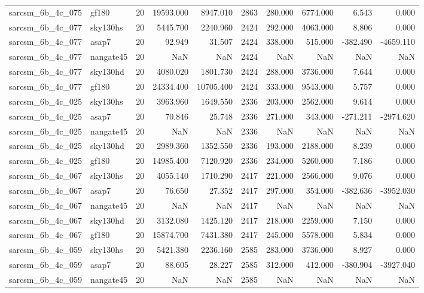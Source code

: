 \begin{longtable}{llrrrrrrrr}
sarcsm\_6b\_4c\_075 & gf180 & 20 & 19593.000 & 8947.010 & 2863 & 280.000 & 6774.000 & 6.543 & 0.000 \\
sarcsm\_6b\_4c\_077 & sky130hs & 20 & 5445.700 & 2240.960 & 2424 & 292.000 & 4063.000 & 8.806 & 0.000 \\
sarcsm\_6b\_4c\_077 & asap7 & 20 & 92.949 & 31.507 & 2424 & 338.000 & 515.000 & -382.490 & -4659.110 \\
sarcsm\_6b\_4c\_077 & nangate45 & 20 & NaN & NaN & 2424 & NaN & NaN & NaN & NaN \\
sarcsm\_6b\_4c\_077 & sky130hd & 20 & 4080.020 & 1801.730 & 2424 & 288.000 & 3736.000 & 7.644 & 0.000 \\
sarcsm\_6b\_4c\_077 & gf180 & 20 & 24334.400 & 10705.400 & 2424 & 333.000 & 9543.000 & 5.757 & 0.000 \\
sarcsm\_6b\_4c\_025 & sky130hs & 20 & 3963.960 & 1649.550 & 2336 & 203.000 & 2562.000 & 9.614 & 0.000 \\
sarcsm\_6b\_4c\_025 & asap7 & 20 & 70.846 & 25.748 & 2336 & 271.000 & 343.000 & -271.211 & -2974.620 \\
sarcsm\_6b\_4c\_025 & nangate45 & 20 & NaN & NaN & 2336 & NaN & NaN & NaN & NaN \\
sarcsm\_6b\_4c\_025 & sky130hd & 20 & 2989.360 & 1352.550 & 2336 & 193.000 & 2188.000 & 8.239 & 0.000 \\
sarcsm\_6b\_4c\_025 & gf180 & 20 & 14985.400 & 7120.920 & 2336 & 234.000 & 5260.000 & 7.186 & 0.000 \\
sarcsm\_6b\_4c\_067 & sky130hs & 20 & 4055.140 & 1710.290 & 2417 & 221.000 & 2566.000 & 9.076 & 0.000 \\
sarcsm\_6b\_4c\_067 & asap7 & 20 & 76.650 & 27.352 & 2417 & 297.000 & 354.000 & -382.636 & -3952.030 \\
sarcsm\_6b\_4c\_067 & nangate45 & 20 & NaN & NaN & 2417 & NaN & NaN & NaN & NaN \\
sarcsm\_6b\_4c\_067 & sky130hd & 20 & 3132.080 & 1425.120 & 2417 & 218.000 & 2259.000 & 7.150 & 0.000 \\
sarcsm\_6b\_4c\_067 & gf180 & 20 & 15874.700 & 7431.380 & 2417 & 245.000 & 5578.000 & 5.834 & 0.000 \\
sarcsm\_6b\_4c\_059 & sky130hs & 20 & 5421.380 & 2236.160 & 2585 & 283.000 & 3736.000 & 8.927 & 0.000 \\
sarcsm\_6b\_4c\_059 & asap7 & 20 & 88.605 & 28.227 & 2585 & 312.000 & 412.000 & -380.904 & -3927.040 \\
sarcsm\_6b\_4c\_059 & nangate45 & 20 & NaN & NaN & 2585 & NaN & NaN & NaN & NaN \\

\end{longtable}
